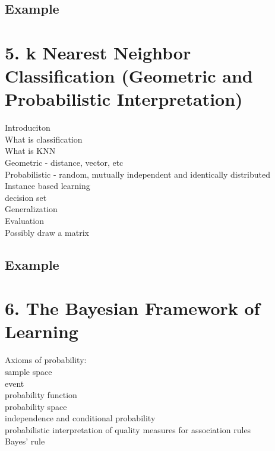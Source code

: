 \documentclass[a4paper,10pt,titlepage]{report}
\begin{document}
\subsection{Example}


\newpage
\section{5.	k Nearest Neighbor Classification (Geometric and Probabilistic Interpretation)}

Introduciton\\
What is classification\\
What is KNN\\
\hspace{10mm}Geometric - distance, vector, etc \\

\hspace{10mm}Probabilistic - random, mutually independent and identically distributed\\
Instance based learning \\
decision set \\
Generalization \\
Evaluation \\
\hspace{10mm} Possibly draw a matrix \\


\subsection{Example}


\newpage
\section{6.	The Bayesian Framework of Learning}
	Axioms of probability:\\
\hspace{10mm}		sample space\\
\hspace{10mm}		event\\
\hspace{10mm}		probability function\\
\hspace{10mm}		probability space\\
	independence and conditional probability\\
	probabilistic interpretation of quality measures for association rules\\
	Bayes’ rule\\
	
\end{document}
